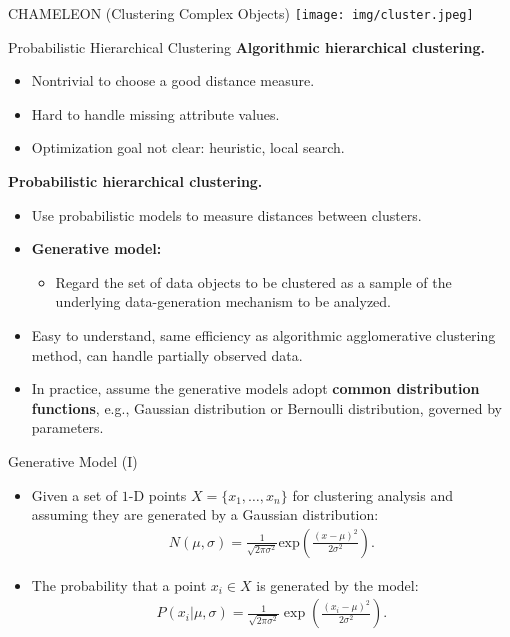 \begin{frame}{CHAMELEON (Clustering Complex Objects)}
  \centering
  \texttt{[image: img/cluster.jpeg]}
\end{frame}

\begin{frame}{Probabilistic Hierarchical Clustering}
  \textbf{Algorithmic hierarchical clustering.}
  \begin{itemize}
  \item Nontrivial to choose a good distance measure.
  \item Hard to handle missing attribute values.
  \item Optimization goal not clear: heuristic, local search.
  \end{itemize}
  \textbf{Probabilistic hierarchical clustering.}
  \begin{itemize}
  \item Use probabilistic models to measure distances between
    clusters.
  \item \textbf{\color{airforceblue}Generative model:}
    \begin{itemize}
    \item Regard the set of data objects to be clustered as a
      sample of the underlying data-generation mechanism to be
      analyzed.
    \end{itemize}
  \item Easy to understand, same efficiency as algorithmic
    agglomerative clustering method, can handle partially observed data.
  \item In practice, assume the generative models adopt
    \textbf{\color{airforceblue}common distribution functions}, e.g.,
    Gaussian distribution or Bernoulli distribution, governed by
    parameters.
  \end{itemize}
\end{frame}

\begin{frame}{Generative Model (I)}
  \centering
  \begin{itemize}
  \item Given a set of $1$-D points $X = \{x_1, \ldots, x_n\}$ for
    clustering analysis and assuming they are generated by a Gaussian
    distribution:
    \begin{align}
      N(\mu,\sigma) = \frac{1}{\sqrt{2 \pi \sigma^2}}
      \text{exp}\left({\frac{(x-\mu)^2}{2\sigma^2}}\right).
    \end{align}
  \item The probability that a point $x_i \in X$ is generated by the
    model:
    \begin{align}
      P(x_i \vert \mu, \sigma) = \frac{1}{\sqrt{2\pi\sigma^2}} \exp\left(
      \frac{(x_i-\mu)^2}{2\sigma^2}\right).
    \end{align}
  \end{itemize}
\end{frame}

